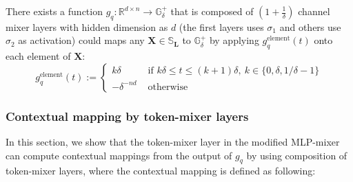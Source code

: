 
\begin{lemma}  \label{section:uniform_approx_step_2_1}
There exists a function $g_q: \mathbb{R}^{d\times n} \rightarrow \mathbb{G}_\delta^+$ that is composed of $(1+\frac{1}{\delta})$ channel mixer layers with hidden dimension as $d$ (the first layers uses $\sigma_1$ and others use $\sigma_2$ as activation) could maps any $\mathbf{X}\in\mathbb{S}_\mathbf{L}$ to $\mathbb{G}_\delta^+$ by applying $g_q^\text{element}(t)$ onto each element of $\mathbf{X}$:
\begin{equation*}
    g_q^\text{element}(t):= \begin{cases}
    k\delta & \text{ if } k\delta \leq t \leq (k+1)\delta,~ k\in\{0, \delta, 1/\delta - 1\} \\ 
    -\delta^{-nd} & \text{ otherwise } 
    \end{cases}
\end{equation*}
\end{lemma}

\subsubsection{Contextual mapping by token-mixer layers}

In this section, we show that the token-mixer layer in the modified MLP-mixer can compute contextual mappings from the output of $g_q$ by using composition of token-mixer layers, where the contextual mapping is defined as following:

